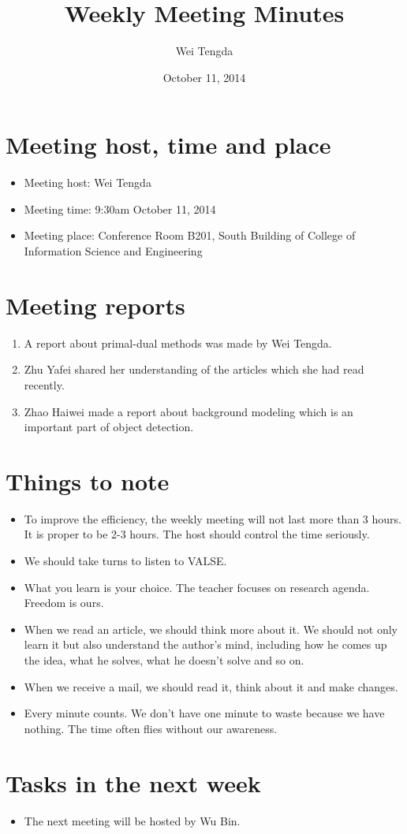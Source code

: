 \documentclass[a4paper，12pt]{article}
\title{Weekly Meeting Minutes}
\author{Wei Tengda}
\date{October 11, 2014}
\begin{document}
\maketitle

\section{Meeting host, time and place}

\begin{itemize}
\item Meeting host: Wei Tengda
\item Meeting time: 9:30am October 11, 2014 
\item Meeting place: Conference Room B201, South Building of College of Information Science and Engineering 
\end{itemize}

\section{Meeting reports}

\begin{enumerate}
\item A report about primal-dual methods was made by Wei Tengda.
\item Zhu Yafei shared her understanding of the articles which she had read recently.
\item Zhao Haiwei made a report about background modeling which is an important part of object detection.
\end{enumerate}

\section {Things to note}

\begin{itemize}
\item To improve the efficiency, the weekly meeting will not last more than 3 hours. It is proper to be 2-3 hours. The host should control the time seriously.
\item We should take turns to listen to VALSE.
\item What you learn is your choice. The teacher focuses on research agenda. Freedom is ours.
\item When we read an article, we should think more about it. We should not only learn it but also understand the author's mind, including how he comes up the idea, what he solves, what he doesn't solve and so on.
\item When we receive a mail, we should read it, think about it and make changes.
\item Every minute counts. We don't have one minute to waste because we have nothing. The time often flies without our awareness.
\end{itemize}

\section {Tasks in the next week }

\begin{itemize}
\item The next meeting will be hosted by Wu Bin.
\end{itemize}
\end{document}
